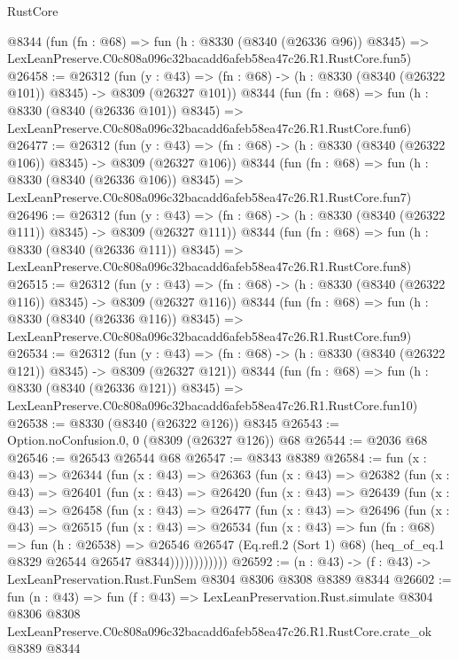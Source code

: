 \begin{lexlean}{RustCore}
\begin{coremodule}
    @8344
    (fun (fn : @68) =>
    fun (h : @8330 (@8340 (@26336 @96)) @8345) =>
    LexLeanPreserve.C0c808a096c32bacadd6afeb58ea47c26.R1.RustCore.fun5)
@26458 := @26312
    (fun (y : @43) => (fn : @68) -> (h : @8330 (@8340 (@26322 @101)) @8345) -> @8309 (@26327 @101))
    @8344
    (fun (fn : @68) =>
    fun (h : @8330 (@8340 (@26336 @101)) @8345) =>
    LexLeanPreserve.C0c808a096c32bacadd6afeb58ea47c26.R1.RustCore.fun6)
@26477 := @26312
    (fun (y : @43) => (fn : @68) -> (h : @8330 (@8340 (@26322 @106)) @8345) -> @8309 (@26327 @106))
    @8344
    (fun (fn : @68) =>
    fun (h : @8330 (@8340 (@26336 @106)) @8345) =>
    LexLeanPreserve.C0c808a096c32bacadd6afeb58ea47c26.R1.RustCore.fun7)
@26496 := @26312
    (fun (y : @43) => (fn : @68) -> (h : @8330 (@8340 (@26322 @111)) @8345) -> @8309 (@26327 @111))
    @8344
    (fun (fn : @68) =>
    fun (h : @8330 (@8340 (@26336 @111)) @8345) =>
    LexLeanPreserve.C0c808a096c32bacadd6afeb58ea47c26.R1.RustCore.fun8)
@26515 := @26312
    (fun (y : @43) => (fn : @68) -> (h : @8330 (@8340 (@26322 @116)) @8345) -> @8309 (@26327 @116))
    @8344
    (fun (fn : @68) =>
    fun (h : @8330 (@8340 (@26336 @116)) @8345) =>
    LexLeanPreserve.C0c808a096c32bacadd6afeb58ea47c26.R1.RustCore.fun9)
@26534 := @26312
    (fun (y : @43) => (fn : @68) -> (h : @8330 (@8340 (@26322 @121)) @8345) -> @8309 (@26327 @121))
    @8344
    (fun (fn : @68) =>
    fun (h : @8330 (@8340 (@26336 @121)) @8345) =>
    LexLeanPreserve.C0c808a096c32bacadd6afeb58ea47c26.R1.RustCore.fun10)
@26538 := @8330 (@8340 (@26322 @126)) @8345
@26543 := Option.noConfusion.{0, 0} (@8309 (@26327 @126)) @68
@26544 := @2036 @68
@26546 := @26543 @26544 @68
@26547 := @8343 @8389
@26584 := fun (x : @43) =>
  @26344
    (fun (x : @43) =>
    @26363
      (fun (x : @43) =>
      @26382
        (fun (x : @43) =>
        @26401
          (fun (x : @43) =>
          @26420
            (fun (x : @43) =>
            @26439
              (fun (x : @43) =>
              @26458
                (fun (x : @43) =>
                @26477
                  (fun (x : @43) =>
                  @26496
                    (fun (x : @43) =>
                    @26515
                      (fun (x : @43) =>
                      @26534
                        (fun (x : @43) =>
                        fun (fn : @68) =>
                        fun (h : @26538) =>
                        @26546
                          @26547
                          (Eq.refl.{2} (Sort 1) @68)
                          (heq_of_eq.{1} @8329 @26544 @26547 @8344))))))))))))
@26592 := (n : @43) -> (f : @43) -> LexLeanPreservation.Rust.FunSem @8304 @8306 @8308 @8389 @8344
@26602 := fun (n : @43) =>
  fun (f : @43) =>
  LexLeanPreservation.Rust.simulate
    @8304
    @8306
    @8308
    LexLeanPreserve.C0c808a096c32bacadd6afeb58ea47c26.R1.RustCore.crate_ok
    @8389
    @8344
\end{coremodule}
\end{lexlean}
